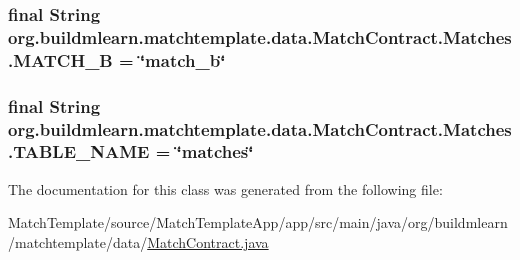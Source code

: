 \subsubsection[{\texorpdfstring{M\+A\+T\+C\+H\+\_\+B}{MATCH_B}}]{\setlength{\rightskip}{0pt plus 5cm}final String org.\+buildmlearn.\+matchtemplate.\+data.\+Match\+Contract.\+Matches.\+M\+A\+T\+C\+H\+\_\+B = \char`\"{}match\+\_\+b\char`\"{}\hspace{0.3cm}{\ttfamily [static]}}\hypertarget{classorg_1_1buildmlearn_1_1matchtemplate_1_1data_1_1MatchContract_1_1Matches_a06832aeb0508d8b24c0da2822feeeca5}{}\label{classorg_1_1buildmlearn_1_1matchtemplate_1_1data_1_1MatchContract_1_1Matches_a06832aeb0508d8b24c0da2822feeeca5}
\subsubsection[{\texorpdfstring{T\+A\+B\+L\+E\+\_\+\+N\+A\+ME}{TABLE_NAME}}]{\setlength{\rightskip}{0pt plus 5cm}final String org.\+buildmlearn.\+matchtemplate.\+data.\+Match\+Contract.\+Matches.\+T\+A\+B\+L\+E\+\_\+\+N\+A\+ME = \char`\"{}matches\char`\"{}\hspace{0.3cm}{\ttfamily [static]}}\hypertarget{classorg_1_1buildmlearn_1_1matchtemplate_1_1data_1_1MatchContract_1_1Matches_a5d5f9f2b24b3e3e42792077a8d037149}{}\label{classorg_1_1buildmlearn_1_1matchtemplate_1_1data_1_1MatchContract_1_1Matches_a5d5f9f2b24b3e3e42792077a8d037149}


The documentation for this class was generated from the following file\+:\begin{DoxyCompactItemize}
\item 
Match\+Template/source/\+Match\+Template\+App/app/src/main/java/org/buildmlearn/matchtemplate/data/\hyperlink{MatchContract_8java}{Match\+Contract.\+java}\end{DoxyCompactItemize}
